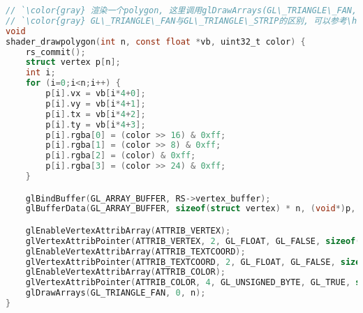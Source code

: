 {\begin{lstlisting}[language=C]
// `\color{gray} 渲染一个polygon, 这里调用glDrawArrays(GL\_TRIANGLE\_FAN, ...)来实现绘制`
// `\color{gray} GL\_TRIANGLE\_FAN与GL\_TRIANGLE\_STRIP的区别, 可以参考\href{http://blog.csdn.net/xiajun07061225/article/details/7455283}{这篇文章}`
void
shader_drawpolygon(int n, const float *vb, uint32_t color) {
    rs_commit();
    struct vertex p[n];
    int i;
    for (i=0;i<n;i++) {
        p[i].vx = vb[i*4+0];
        p[i].vy = vb[i*4+1];
        p[i].tx = vb[i*4+2];
        p[i].ty = vb[i*4+3];
        p[i].rgba[0] = (color >> 16) & 0xff;
        p[i].rgba[1] = (color >> 8) & 0xff;
        p[i].rgba[2] = (color) & 0xff;
        p[i].rgba[3] = (color >> 24) & 0xff;
    }

    glBindBuffer(GL_ARRAY_BUFFER, RS->vertex_buffer);
    glBufferData(GL_ARRAY_BUFFER, sizeof(struct vertex) * n, (void*)p, GL_DYNAMIC_DRAW);

    glEnableVertexAttribArray(ATTRIB_VERTEX);
    glVertexAttribPointer(ATTRIB_VERTEX, 2, GL_FLOAT, GL_FALSE, sizeof(struct vertex), BUFFER_OFFSET(0));
    glEnableVertexAttribArray(ATTRIB_TEXTCOORD);
    glVertexAttribPointer(ATTRIB_TEXTCOORD, 2, GL_FLOAT, GL_FALSE, sizeof(struct vertex), BUFFER_OFFSET(8));
    glEnableVertexAttribArray(ATTRIB_COLOR);
    glVertexAttribPointer(ATTRIB_COLOR, 4, GL_UNSIGNED_BYTE, GL_TRUE, sizeof(struct vertex), BUFFER_OFFSET(16));
    glDrawArrays(GL_TRIANGLE_FAN, 0, n);
}

\end{lstlisting}
}

